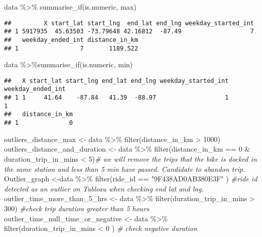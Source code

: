\documentclass[
]{article}
\newenvironment{Shaded}{\begin{snugshade}}{\end{snugshade}}
\newcommand{\CommentTok}[1]{\textcolor[rgb]{0.56,0.35,0.01}{\textit{#1}}}
\newcommand{\DecValTok}[1]{\textcolor[rgb]{0.00,0.00,0.81}{#1}}
\newcommand{\FunctionTok}[1]{\textcolor[rgb]{0.00,0.00,0.00}{#1}}
\newcommand{\NormalTok}[1]{#1}
\newcommand{\OtherTok}[1]{\textcolor[rgb]{0.56,0.35,0.01}{#1}}
\newcommand{\SpecialCharTok}[1]{\textcolor[rgb]{0.00,0.00,0.00}{#1}}
\newcommand{\StringTok}[1]{\textcolor[rgb]{0.31,0.60,0.02}{#1}}
\begin{document}
\begin{Shaded}
\begin{Highlighting}[]
\NormalTok{data }\SpecialCharTok{\%\textgreater{}\%} \FunctionTok{summarise\_if}\NormalTok{(is.numeric, max)}
\end{Highlighting}
\end{Shaded}

\begin{verbatim}
##         X start_lat start_lng  end_lat end_lng weekday_started_int
## 1 5917935  45.63503 -73.79648 42.16812  -87.49                   7
##   weekday_ended_int distance_in_km
## 1                 7       1189.522
\end{verbatim}

\begin{Shaded}
\begin{Highlighting}[]
\NormalTok{data }\SpecialCharTok{\%\textgreater{}\%}\FunctionTok{summarise\_if}\NormalTok{(is.numeric, min)}
\end{Highlighting}
\end{Shaded}

\begin{verbatim}
##   X start_lat start_lng end_lat end_lng weekday_started_int weekday_ended_int
## 1 1     41.64    -87.84   41.39  -88.97                   1                 1
##   distance_in_km
## 1              0
\end{verbatim}

\begin{Shaded}
\begin{Highlighting}[]
\NormalTok{outliers\_distance\_max }\OtherTok{\textless{}{-}}\NormalTok{ data }\SpecialCharTok{\%\textgreater{}\%} \FunctionTok{filter}\NormalTok{(distance\_in\_km }\SpecialCharTok{\textgreater{}} \DecValTok{1000}\NormalTok{)}
\NormalTok{outliers\_distance\_and\_duration }\OtherTok{\textless{}{-}}\NormalTok{ data }\SpecialCharTok{\%\textgreater{}\%} \FunctionTok{filter}\NormalTok{(distance\_in\_km }\SpecialCharTok{==} \DecValTok{0} \SpecialCharTok{\&}\NormalTok{ duration\_trip\_in\_mins }\SpecialCharTok{\textless{}} \DecValTok{5}\NormalTok{)}\CommentTok{\# we will remove the trips that the bike is docked in the same station and less than 5 min have passed. Candidate to abandon trip.}
\NormalTok{Outlier\_graph }\OtherTok{\textless{}{-}}\NormalTok{data }\SpecialCharTok{\%\textgreater{}\%} \FunctionTok{filter}\NormalTok{(ride\_id }\SpecialCharTok{==} \StringTok{"9F438AD0AB380E3F"}\NormalTok{ )  }\CommentTok{\#ride id detected as an outlier on Tableau when checking end lat and lng.}
\NormalTok{outlier\_time\_more\_than\_5\_hrs }\OtherTok{\textless{}{-}}\NormalTok{ data }\SpecialCharTok{\%\textgreater{}\%} \FunctionTok{filter}\NormalTok{(duration\_trip\_in\_mins }\SpecialCharTok{\textgreater{}} \DecValTok{300}\NormalTok{)  }\CommentTok{\#check trip duration greater than 5 hours}
\NormalTok{outlier\_time\_null\_time\_or\_negative }\OtherTok{\textless{}{-}}\NormalTok{ data }\SpecialCharTok{\%\textgreater{}\%} \FunctionTok{filter}\NormalTok{(duration\_trip\_in\_mins }\SpecialCharTok{\textless{}} \DecValTok{0}\NormalTok{ ) }\CommentTok{\# check negative duration }
\end{Highlighting}
\end{Shaded}
\end{document}
